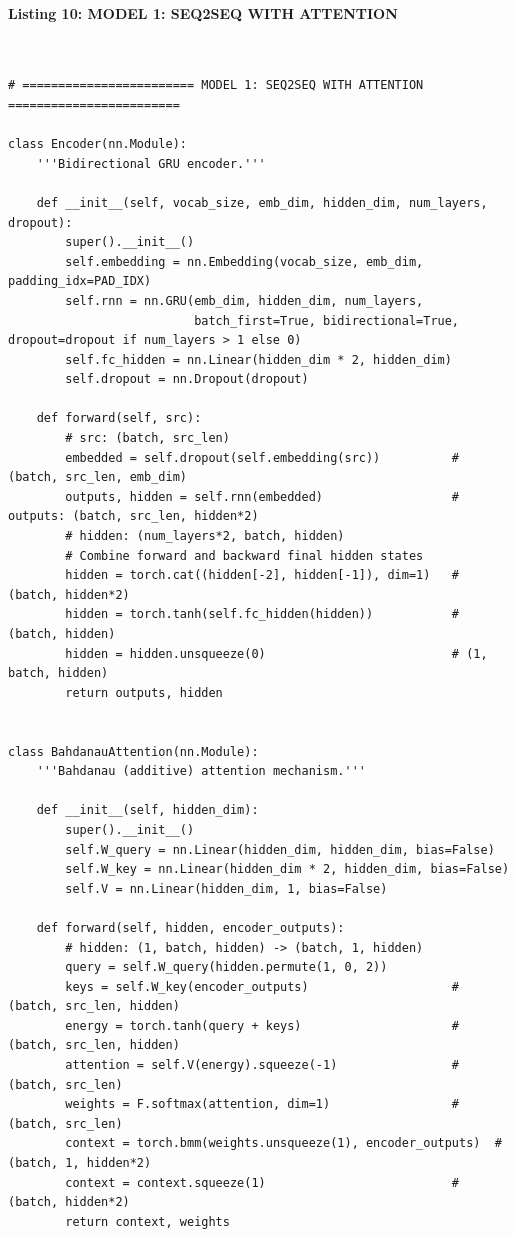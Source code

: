 \documentclass[12pt,a4paper,oneside]{report}
\begin{document}
\paragraph{Listing 10: MODEL 1: SEQ2SEQ WITH ATTENTION}\mbox{}\\[-1ex]
\begin{Verbatim}[commandchars=\\\{\},breaklines=true,breakanywhere=true,fontsize=\scriptsize,frame=leftline,framesep=2mm,rulecolor=\color{gray}]
# ======================== MODEL 1: SEQ2SEQ WITH ATTENTION ========================

class Encoder(nn.Module):
    '''Bidirectional GRU encoder.'''

    def __init__(self, vocab_size, emb_dim, hidden_dim, num_layers, dropout):
        super().__init__()
        self.embedding = nn.Embedding(vocab_size, emb_dim, padding_idx=PAD_IDX)
        self.rnn = nn.GRU(emb_dim, hidden_dim, num_layers,
                          batch_first=True, bidirectional=True, dropout=dropout if num_layers > 1 else 0)
        self.fc_hidden = nn.Linear(hidden_dim * 2, hidden_dim)
        self.dropout = nn.Dropout(dropout)

    def forward(self, src):
        # src: (batch, src_len)
        embedded = self.dropout(self.embedding(src))          # (batch, src_len, emb_dim)
        outputs, hidden = self.rnn(embedded)                  # outputs: (batch, src_len, hidden*2)
        # hidden: (num_layers*2, batch, hidden)
        # Combine forward and backward final hidden states
        hidden = torch.cat((hidden[-2], hidden[-1]), dim=1)   # (batch, hidden*2)
        hidden = torch.tanh(self.fc_hidden(hidden))           # (batch, hidden)
        hidden = hidden.unsqueeze(0)                          # (1, batch, hidden)
        return outputs, hidden


class BahdanauAttention(nn.Module):
    '''Bahdanau (additive) attention mechanism.'''

    def __init__(self, hidden_dim):
        super().__init__()
        self.W_query = nn.Linear(hidden_dim, hidden_dim, bias=False)
        self.W_key = nn.Linear(hidden_dim * 2, hidden_dim, bias=False)
        self.V = nn.Linear(hidden_dim, 1, bias=False)

    def forward(self, hidden, encoder_outputs):
        # hidden: (1, batch, hidden) -> (batch, 1, hidden)
        query = self.W_query(hidden.permute(1, 0, 2))
        keys = self.W_key(encoder_outputs)                    # (batch, src_len, hidden)
        energy = torch.tanh(query + keys)                     # (batch, src_len, hidden)
        attention = self.V(energy).squeeze(-1)                # (batch, src_len)
        weights = F.softmax(attention, dim=1)                 # (batch, src_len)
        context = torch.bmm(weights.unsqueeze(1), encoder_outputs)  # (batch, 1, hidden*2)
        context = context.squeeze(1)                          # (batch, hidden*2)
        return context, weights



\end{Verbatim}
\end{document}
